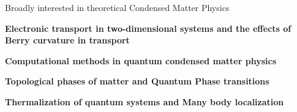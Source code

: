 

\begin{cventries}

  \cventry
    {} %
    {Broadly interested in theoretical Condensed Matter Physics} %
    {} %
    {} %
    {
      \begin{cvitems} %
      	\item {\textbf{Electronic transport in two-dimensional systems and the effects of Berry curvature in transport}}
        \item {\textbf{Computational methods in quantum condensed matter physics}}
        \item {\textbf{Topological phases of matter and Quantum Phase transitions}}
        \item {\textbf{Thermalization of quantum systems and Many body localization}}
      \end{cvitems}
    }

\end{cventries}
